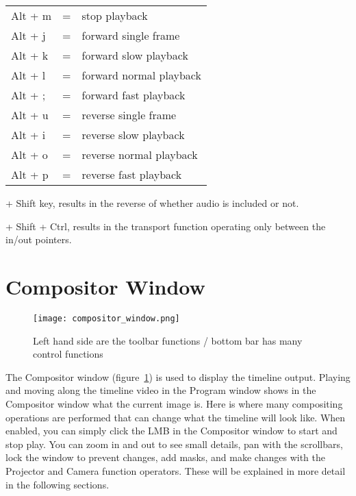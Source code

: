 \begin{tabular}{lcl}
	Alt + m&=&stop playback\\

	Alt + j&=&forward single frame\\

	Alt + k&=&forward slow playback\\

	Alt + l&=&forward normal playback\\

	Alt + ;&=&forward fast playback\\

	Alt + u&=&reverse single frame\\

	Alt + i&=&reverse slow playback\\

	Alt + o&=&reverse normal playback\\

	Alt + p&=&reverse fast playback\\
\end{tabular}
\begin{minipage}{.45\linewidth}
+ Shift key, results in the reverse of whether audio is included or not.
\vspace{1ex}

+ Shift + Ctrl, results in the transport function operating only between the in/out pointers.
\end{minipage}

\section{Compositor Window}%
\label{sec:compositor_window}

\begin{figure}[htpb]
    \centering
    \texttt{[image: compositor\_window.png]}
    \caption{Left hand side are the toolbar functions / bottom bar has many control functions}
    \label{fig:compositor_window}
\end{figure}

The Compositor window (figure~\ref{fig:compositor_window}) is used to display the timeline
output.  Playing and moving along the timeline video in the Program window shows in the
Compositor window what the current image is.  Here is where many compositing operations are
performed that can change 
what the timeline will look like.  When enabled, you can simply click the LMB in the Compositor
window to start and stop play.
  You can zoom in and out to 
see small details, pan with the scrollbars, lock the window to prevent changes, add masks,
and make changes with the Projector and Camera function operators. These will be explained
in more detail in the following sections.

